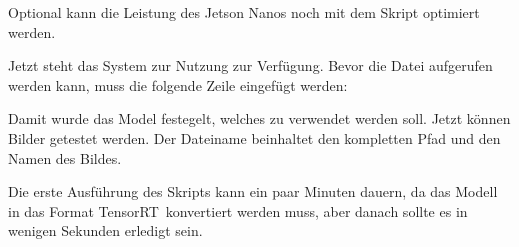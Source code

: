 \medskip

 \newline
{} \newline
{} \newline
{} \newline
{} \newline
{} \newline
{} \newline
{} \newline
{} \newline
{} \newline
{} \newline
{}

\medskip

Optional kann die Leistung des Jetson Nanos noch mit dem Skript   optimiert werden.


\medskip



\medskip

Jetzt steht das System zur Nutzung zur Verfügung. Bevor die Datei  aufgerufen
werden kann, muss die folgende Zeile eingefügt werden:

\medskip


\medskip

Damit wurde das Model festegelt, welches zu verwendet werden soll. 
Jetzt können Bilder getestet werden. Der Dateiname \FILE{[image]} beinhaltet den kompletten
Pfad und den Namen  des Bildes.

\medskip


\medskip



Die erste Ausführung des Skripts kann ein paar Minuten dauern, da das Modell in das Format 
\glqq TensorRT\grqq\,  konvertiert werden muss, aber danach sollte es in wenigen Sekunden erledigt sein.


